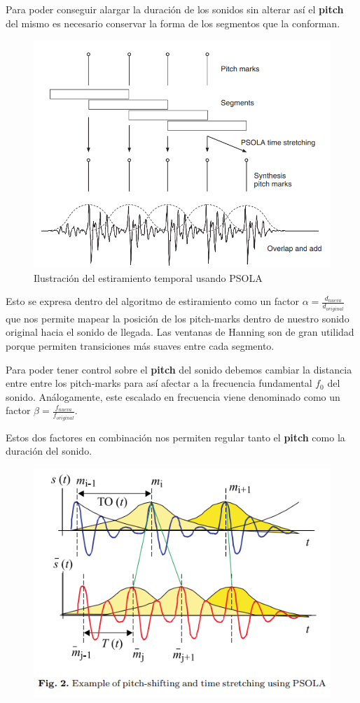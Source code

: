 Para poder conseguir alargar la duración de los sonidos sin alterar así el \textbf{pitch} del mismo es necesario conservar la forma de los segmentos que la conforman.

\begin{figure}[H]
	\centering
	\includegraphics[width=0.7\linewidth]{ImagenesEjercicio5/TimeStretchingPSOLA.PNG}
	\caption{Ilustración del estiramiento temporal usando PSOLA}
	\label{fig:TSPSOLA}
\end{figure}

Esto se expresa dentro del algoritmo de estiramiento como un factor $\alpha = \frac{d_{nueva}}{d_{original}}$ que nos permite mapear la posición de los pitch-marks dentro de nuestro sonido original hacia el sonido de llegada. Las ventanas de Hanning son de gran utilidad porque permiten transiciones más suaves entre cada segmento.


Para poder tener control sobre el \textbf{pitch} del sonido debemos cambiar la distancia entre entre los pitch-marks para así afectar a la frecuencia fundamental $f_0$ del sonido. Análogamente, este escalado en frecuencia viene denominado como un factor $\beta = \frac{f_{nueva}}{f_{original}}$.

Estos dos factores en combinación nos permiten regular tanto el \textbf{pitch} como la duración del sonido.

\begin{figure}[H]
	\centering
	\includegraphics[width=0.7\linewidth]{ImagenesEjercicio5/PTS}
	\caption{}
	\label{fig:pts}
\end{figure}

